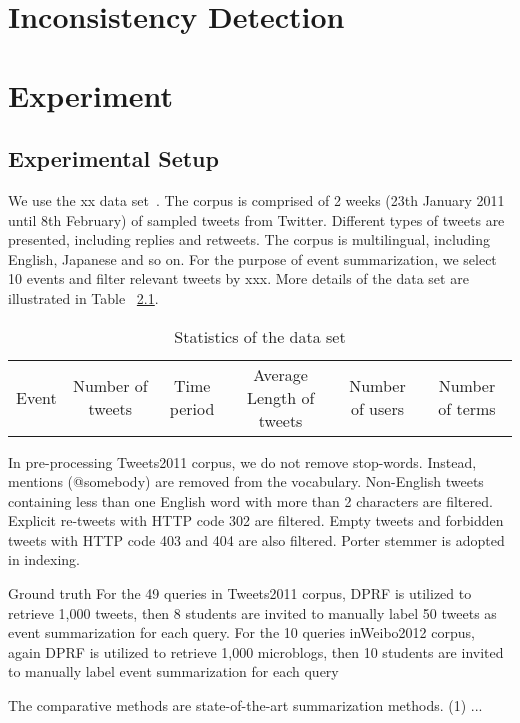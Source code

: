 \documentclass{llncs}
\begin{document}
\section{Inconsistency Detection}\label{sec:inconsistency}

\section{Experiment}\label{sec:experiment}
\subsection{Experimental Setup}
We use the xx data set~\cite{}. The corpus is comprised of 2 weeks (23th January 2011 until
8th February) of sampled tweets from Twitter. Different types of tweets are presented, including replies
and retweets. The corpus is multilingual, including English, Japanese and so on. For the purpose of event summarization, we select 10 events and filter relevant tweets by xxx. More details of the data set are illustrated in Table ~\ref{}.

\begin{table}[htp]
\caption{Statistics of the data set}
\begin{center}
\begin{tabular}{|c|c|c|c|c|c|}
Event & Number of tweets & Time period & Average Length of tweets & Number of users & Number of terms
\end{tabular}
\end{center}
\label{default}
\end{table}

In pre-processing Tweets2011 corpus, we do not
remove stop-words. Instead, mentions (@somebody)
are removed from the vocabulary. Non-English tweets
containing less than one English word with more
than 2 characters are filtered. Explicit re-tweets with
HTTP code 302 are filtered. Empty tweets and forbidden
tweets with HTTP code 403 and 404 are also
filtered. Porter stemmer is adopted in indexing.

Ground truth For the 49 queries in Tweets2011 corpus,
DPRF is utilized to retrieve 1,000 tweets, then
8 students are invited to manually label 50 tweets
as event summarization for each query. For the 10
queries inWeibo2012 corpus, again DPRF is utilized to
retrieve 1,000 microblogs, then 10 students are invited
to manually label event summarization for each query

The comparative methods are  state-of-the-art summarization methods. (1) ...
\end{document}
